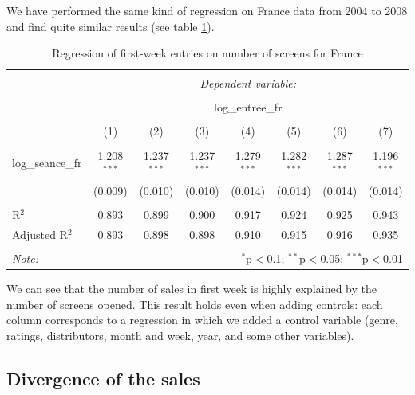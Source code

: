 We have performed the same kind of regression on France data from 2004 to 2008 and find quite similar results (see table \ref{part2.1_tab3}).
\begin{table}[!htbp] \centering 
	\caption{Regression of first-week entries on number of screens for France} 
	\label{part2.1_tab3} 
	\begin{tabular}{@{\extracolsep{0pt}}lccccccc} 
		\\[-1.8ex]\hline 
		\hline \\[-1.8ex] 
		& \multicolumn{7}{c}{\textit{Dependent variable:}} \\ 
		\cline{2-8} 
		\\[-1.8ex] & \multicolumn{7}{c}{log\_entree\_fr} \\ 
		\\[-1.8ex] & (1) & (2) & (3) & (4) & (5) & (6) & (7)\\ 
		\hline \\[-1.8ex] 
		log\_seance\_fr & 1.208$^{***}$ & 1.237$^{***}$ & 1.237$^{***}$ & 1.279$^{***}$ & 1.282$^{***}$ & 1.287$^{***}$ & 1.196$^{***}$ \\ 
		& (0.009) & (0.010) & (0.010) & (0.014) & (0.014) & (0.014) & (0.014) \\ 
		\hline \\[-1.8ex] 
		R$^{2}$ & 0.893 & 0.899 & 0.900 & 0.917 & 0.924 & 0.925 & 0.943 \\ 
		Adjusted R$^{2}$ & 0.893 & 0.898 & 0.898 & 0.910 & 0.915 & 0.916 & 0.935 \\ 
		\hline 
		\hline \\[-1.8ex] 
		\textit{Note:}  & \multicolumn{7}{r}{$^{*}$p$<$0.1; $^{**}$p$<$0.05; $^{***}$p$<$0.01} \\ 
	\end{tabular} 
\end{table} 
We can see that the number of sales in first week is highly explained by the number of screens opened. This result holds even when adding controls: each column corresponds to a regression in which we added a control variable (genre, ratings, distributors, month and week, year, and some other variables).  


\subsection{Divergence of the sales}\label{subsec2.2}


